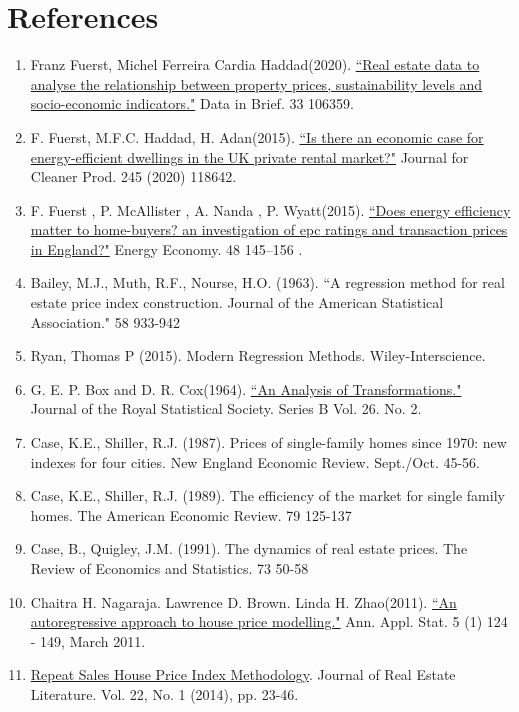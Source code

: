 \documentclass[12pt]{article}
\begin{document}
\section{References}
\begin{enumerate}
    \item Franz Fuerst, Michel Ferreira Cardia Haddad(2020). \href{https://doi.org/10.1016/j.dib.2020.106359}{``Real estate data to analyse the relationship between property prices, sustainability levels and socio-economic indicators."} Data in Brief. 33 106359.
    \item F. Fuerst, M.F.C. Haddad, H. Adan(2015). \href{https://doi.org/10.1016/j.jclepro.2019.118642}{``Is there an economic case for energy-efficient dwellings in the UK private rental market?"} Journal for Cleaner Prod. 245 (2020) 118642. 
    \item F. Fuerst , P. McAllister , A. Nanda , P. Wyatt(2015). \href{https://doi.org/10.1016/j.eneco.2014.12.012}{``Does  energy efficiency matter to home-buyers? an investigation of \acrshort{epc} ratings and transaction prices in England?"} Energy Economy. 48 145–156 .
    \item Bailey, M.J., Muth, R.F., Nourse, H.O. (1963). ``A regression method for real estate price index construction. Journal of the American Statistical Association." 58 933-942
    \item Ryan, Thomas P (2015). Modern Regression Methods. Wiley-Interscience.
    \item G. E. P. Box and D. R. Cox(1964). \href{https://www.jstor.org/stable/2984418}{``An Analysis of Transformations."} Journal of the Royal Statistical Society. Series B Vol. 26. No. 2.
    \item Case, K.E., Shiller, R.J. (1987). Prices of single-family homes since 1970: new indexes for four cities. New England Economic Review. Sept./Oct. 45-56. 
    \item Case, K.E., Shiller, R.J. (1989). The efficiency of the market for single family homes. The American Economic Review. 79 125-137
    \item Case, B., Quigley, J.M. (1991). The dynamics of real estate prices. The Review of Economics and Statistics. 73 50-58
    \item Chaitra H. Nagaraja. Lawrence D. Brown. Linda H. Zhao(2011). \href{https://doi.org/10.1214/10-AOAS380}{``An autoregressive approach to house price modelling."} Ann. Appl. Stat. 5 (1) 124 - 149, March 2011.
    \item \href{https://www.jstor.org/stable/24885063}{Repeat Sales House Price Index Methodology}. Journal of Real Estate Literature. Vol. 22, No. 1 (2014), pp. 23-46.
\end{enumerate}

\printglossary[type=\acronymtype]

\printglossary
\end{document}

